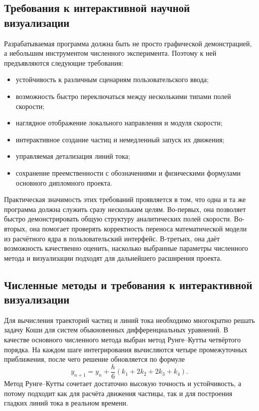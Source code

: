 \documentclass[14pt,a4paper]{extarticle}
\numberwithin{figure}{section}
\numberwithin{table}{section}
\begin{document}
\subsection{Требования к интерактивной научной визуализации}

Разрабатываемая программа должна быть не просто графической демонстрацией, а
небольшим инструментом численного эксперимента. Поэтому к ней предъявляются
следующие требования:
\begin{itemize}
    \item устойчивость к различным сценариям пользовательского ввода;
    \item возможность быстро переключаться между несколькими типами полей скорости;
    \item наглядное отображение локального направления и модуля скорости;
    \item интерактивное создание частиц и немедленный запуск их движения;
    \item управляемая детализация линий тока;
    \item сохранение преемственности с обозначениями и физическими формулами основного дипломного проекта.
\end{itemize}

Практическая значимость этих требований проявляется в том, что одна и та же
программа должна служить сразу нескольким целям. Во-первых, она позволяет быстро
демонстрировать общую структуру аналитических полей скорости. Во-вторых, она
помогает проверять корректность переноса математической модели из расчётного ядра
в пользовательский интерфейс. В-третьих, она даёт возможность качественно оценить,
насколько выбранные параметры численного метода и визуализации подходят для
дальнейшего расширения проекта.

\subsection{Численные методы и требования к интерактивной визуализации}

Для вычисления траекторий частиц и линий тока необходимо многократно решать
задачу Коши для систем обыкновенных дифференциальных уравнений. В качестве
основного численного метода выбран метод Рунге--Кутты четвёртого порядка. На
каждом шаге интегрирования вычисляются четыре промежуточных приближения,
после чего решение обновляется по формуле
\begin{equation}
    y_{n+1} = y_n + \frac{h}{6}(k_1 + 2k_2 + 2k_3 + k_4).
\end{equation}
Метод Рунге--Кутты сочетает достаточно высокую точность и устойчивость, а потому
подходит как для расчёта движения частицы, так и для построения гладких линий
тока в реальном времени.
\end{document}
